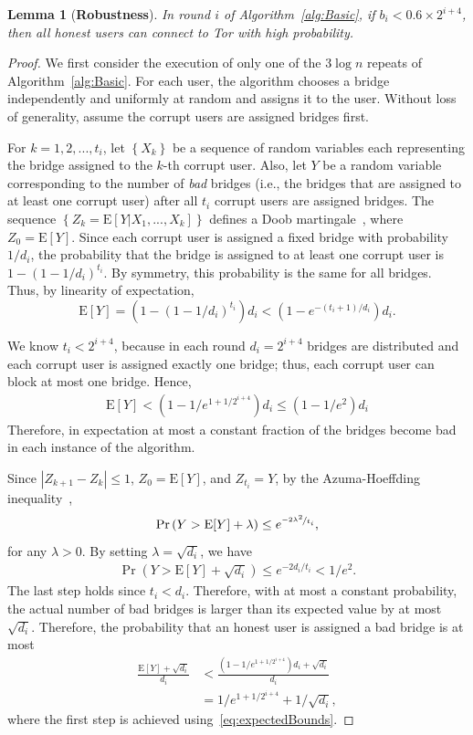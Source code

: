 \documentclass[letterpaper,twocolumn,10pt]{article}
\newcommand{\ie}{i.e.}
\newcommand{\E}{\mathbf{\mathrm{E}}}
\newtheorem{lemma}{Lemma}
\newcommand{\sfsize}{\fontsize{0.68\baselineskip}{0.68\baselineskip}\selectfont}
\newcommand{\sans}[1]{\textbf{\textsf{\sfsize \mbox{#1}}}}
\begin{document}
\begin{lemma}[\sans{Robustness}] \label{lem:robustness}
	In round $i$ of Algorithm~\ref{alg:Basic}, if ${b_i < 0.6 \times 2^{i+4}}$, then all honest users can connect to Tor with high probability.
\end{lemma}
\begin{proof}
	We first consider the execution of only one of the $3\log{n}$ repeats of Algorithm~\ref{alg:Basic}. For each user, the algorithm chooses a bridge independently and uniformly at random and assigns it to the user. Without loss of generality, assume the corrupt users are assigned bridges first.
	
	For ${k=1,2,...,t_i}$, let $\left\{X_k\right\}$ be a sequence of random variables each representing the bridge assigned to the $k$-th corrupt user. Also, let $Y$ be a random variable corresponding to the number of \emph{bad} bridges (\ie, the bridges that are assigned to at least one corrupt user) after all $t_i$ corrupt users are assigned bridges. The sequence ${\left\{Z_k = \E[Y|X_1,...,X_k]\right\}}$ defines a Doob martingale~\cite[Chapter~5]{dubhashi:2009}, where ${Z_0 = \E[Y]}$. 
	Since each corrupt user is assigned a fixed bridge with probability $1/d_i$, the probability that the bridge is assigned to at least one corrupt user is ${1-(1-1/d_i)^{t_i}}$. By symmetry, this probability is the same for all bridges. Thus, by linearity of expectation,
	\[\E[Y] = \left(1 - \left(1-1/d_i\right)^{t_i}\right)d_i < (1 - e^{-(t_i+1)/d_i})d_i.\]
	
	We know ${t_i < 2^{i+4}}$, because in each round ${d_i = 2^{i+4}}$ bridges are distributed and each corrupt user is assigned exactly one bridge; thus, each corrupt user can block at most one bridge. Hence, 
	\begin{align}
	\E[Y] < (1 - 1/e^{1+1/2^{i+4}})d_i \leq (1 - 1/e^2)d_i \label{eq:expectedBounds}
	\end{align}
	Therefore, in expectation at most a constant fraction of the bridges become bad in each instance of the algorithm. 
	
	Since ${|Z_{k+1} - Z_k| \leq 1}$, ${Z_0 = \E[Y]}$, and ${Z_{t_i} = Y}$, by the Azuma-Hoeffding inequality~\cite[Theorem 5.2]{dubhashi:2009},
	\[\Pr\left(Y > \E[Y] + \lambda\right) \leq e^{\nicefrac{-2\lambda^2}{t_i}},\]
	for any ${\lambda > 0}$. 
	By setting ${\lambda = \sqrt{d_i}}$, we have
	\begin{align}
	\Pr(Y > \E[Y] + \sqrt{d_i}) \leq e^{-2d_i/t_i} < 1/e^2. \label{eq:p1}
	\end{align}
	The last step holds since ${t_i < d_i}$. Therefore, with at most a constant probability, the actual number of bad bridges is larger than its expected value by at most $\sqrt{d_i}$. Therefore, the probability that an honest user is assigned a bad bridge is at most
	\begin{align}
	\frac{\E[Y] + \sqrt{d_i}}{d_i} &< \frac{(1-1/e^{1+1/2^{i+4}})d_i + \sqrt{d_i}}{d_i} \nonumber \\ &= 1/e^{1+1/2^{i+4}} + 1/\sqrt{d_i}, \label{eq:p2}
	\end{align}
	where the first step is achieved using~\eqref{eq:expectedBounds}.
	

\end{proof}
\end{document}
